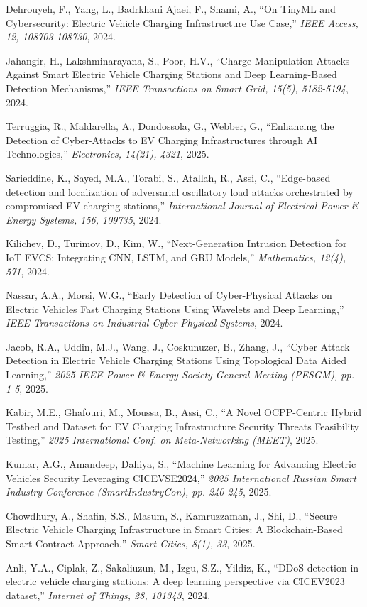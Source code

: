 Dehrouyeh, F., Yang, L., Badrkhani Ajaei, F., Shami, A.,
``On TinyML and Cybersecurity: Electric Vehicle Charging Infrastructure Use Case,''
\textit{IEEE Access, 12, 108703-108730}, 2024.

Jahangir, H., Lakshminarayana, S., Poor, H.V.,
``Charge Manipulation Attacks Against Smart Electric Vehicle Charging Stations and Deep Learning-Based Detection Mechanisms,''
\textit{IEEE Transactions on Smart Grid, 15(5), 5182-5194}, 2024.

Terruggia, R., Maldarella, A., Dondossola, G., Webber, G.,
``Enhancing the Detection of Cyber-Attacks to EV Charging Infrastructures through AI Technologies,''
\textit{Electronics, 14(21), 4321}, 2025.

Sarieddine, K., Sayed, M.A., Torabi, S., Atallah, R., Assi, C.,
``Edge-based detection and localization of adversarial oscillatory load attacks orchestrated by compromised EV charging stations,''
\textit{International Journal of Electrical Power & Energy Systems, 156, 109735}, 2024.

Kilichev, D., Turimov, D., Kim, W.,
``Next-Generation Intrusion Detection for IoT EVCS: Integrating CNN, LSTM, and GRU Models,''
\textit{Mathematics, 12(4), 571}, 2024.

Nassar, A.A., Morsi, W.G.,
``Early Detection of Cyber-Physical Attacks on Electric Vehicles Fast Charging Stations Using Wavelets and Deep Learning,''
\textit{IEEE Transactions on Industrial Cyber-Physical Systems}, 2024.

Jacob, R.A., Uddin, M.J., Wang, J., Coskunuzer, B., Zhang, J.,
``Cyber Attack Detection in Electric Vehicle Charging Stations Using Topological Data Aided Learning,''
\textit{2025 IEEE Power & Energy Society General Meeting (PESGM), pp. 1-5}, 2025.

Kabir, M.E., Ghafouri, M., Moussa, B., Assi, C.,
``A Novel OCPP-Centric Hybrid Testbed and Dataset for EV Charging Infrastructure Security Threats Feasibility Testing,''
\textit{2025 International Conf. on Meta-Networking (MEET)}, 2025.

Kumar, A.G., Amandeep, Dahiya, S.,
``Machine Learning for Advancing Electric Vehicles Security Leveraging CICEVSE2024,''
\textit{2025 International Russian Smart Industry Conference (SmartIndustryCon), pp. 240-245}, 2025.

Chowdhury, A., Shafin, S.S., Masum, S., Kamruzzaman, J., Shi, D.,
``Secure Electric Vehicle Charging Infrastructure in Smart Cities: A Blockchain-Based Smart Contract Approach,''
\textit{Smart Cities, 8(1), 33}, 2025.

Anli, Y.A., Ciplak, Z., Sakaliuzun, M., Izgu, S.Z., Yildiz, K.,
``DDoS detection in electric vehicle charging stations: A deep learning perspective via CICEV2023 dataset,''
\textit{Internet of Things, 28, 101343}, 2024.
